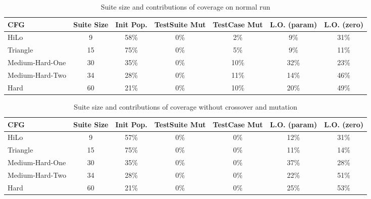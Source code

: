 \documentclass[runningheads]{llncs}
\begin{document}
\begin{table}[h!]
	\begin{center}
		\begin{tabular}{| l | c || c | c | c | c | c |}
			\hline
			CFG             & Suite Size & Init Pop. & TestSuite Mut & TestCase Mut & L.O. (param) & L.O. (zero) \\ \hline
			HiLo            & 9          & 58\%      & 0\%           & 2\%          & 9\%          & 31\%        \\ \hline
			Triangle        & 15         & 75\%      & 0\%           & 5\%          & 9\%          & 11\%        \\ \hline
			Medium-Hard-One & 30         & 35\%      & 0\%           & 10\%         & 32\%         & 23\%        \\ \hline
			Medium-Hard-Two & 34         & 28\%      & 0\%           & 11\%         & 14\%         & 46\%        \\ \hline
			Hard            & 60         & 21\%      & 0\%           & 10\%         & 20\%         & 49\%        \\ \hline
		\end{tabular}
	\end{center}
	\caption{Suite size and contributions of coverage on normal run}
	\label{tab:ContrAll}
\end{table}

\begin{table}[h!]
	\begin{center}
		\begin{tabular}{| l | c || c | c | c | c | c |}
			\hline
			CFG             & Suite Size & Init Pop. & TestSuite Mut & TestCase Mut & L.O. (param) & L.O. (zero) \\ \hline
			HiLo            & 9          & 57\%      & 0\%           & 0\%          & 12\%         & 31\%        \\ \hline
			Triangle        & 15         & 75\%      & 0\%           & 0\%          & 11\%         & 14\%        \\ \hline
			Medium-Hard-One & 30         & 35\%      & 0\%           & 0\%          & 37\%         & 28\%        \\ \hline
			Medium-Hard-Two & 34         & 28\%      & 0\%           & 0\%          & 22\%         & 51\%        \\ \hline
			Hard            & 60         & 21\%      & 0\%           & 0\%          & 25\%         & 53\%        \\ \hline
		\end{tabular}
	\end{center}
	\caption{Suite size and contributions of coverage without crossover and mutation} 
	\label{tab:ContribNoGA}
\end{table}
\end{document}
